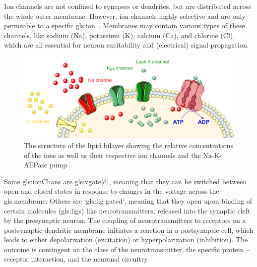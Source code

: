 \documentclass[class={myRUCProject}, crop=false]{standalone}
\begin{document}
Ion channels are not confined to synapses or dendrites, but are distributed across the whole outer membrane. However, ion channels highly selective and are only permeable to a specific \gls{gls:ion}~\cite{Hammond2015ch4}. Membranes may  contain various types of these channels, like sodium (\gls{Na}), potassium (\gls{K}), calcium (\gls{Ca}), and chlorine (\gls{Cl}), which are all essential for neuron excitability and  (electrical) signal propagation.
\begin{figure}
    \centering
    \includegraphics[width=0.75\linewidth]{Pictures//Anakin/channels.png}
    \caption{The structure of the lipid bilayer showing the relative concentrations of the ions as well as their respective ion channels and the Na-K-ATPase pump. \cite{channels}}
    \label{fig:channels}
\end{figure}

Some \glspl{gls:ionChan} are \gls{gls:vgate}[d], meaning that they can be switched between open and closed states in response to changes in the voltage across the \gls{gls:membrane}. 
Others are `\gls{gls:lig} gated', meaning that they  open upon binding of certain molecules (\gls{gls:lig}s) like neurotransmitters, released into the synaptic cleft by the presynaptic neuron. The coupling of neurotransmitters to receptors on a postsynaptic dendritic membrane initiates a reaction in a postsynaptic cell, which leads to either depolarization (excitation) or hyperpolarization (inhibition). The outcome is contingent on the class of the neurotransmitter, the specific protein – receptor interaction, and the neuronal circuitry.


\end{document}
